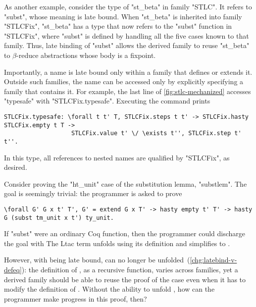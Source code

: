 As another example, consider the type of "st_beta" in family "STLC".
It refers to "subst", whose meaning is late bound.
When "st_beta" is inherited into family "STLCFix", "st_beta" has a type that now
refers to the "subst" function in "STLCFix", where "subst" is defined
by handling all the five cases known to that family.
Thus, late binding of "subst" allows the derived family to reuse "st_beta"
to $\beta$-reduce abstractions whose body is a fixpoint.

Importantly, a name is late bound only within a family that defines or extends it.
Outside such families, the name can be accessed only by explicitly
specifying a family that contains it.
For example, the last line of \cref{fig:stlc-mechanized} accesses "typesafe"
with "STLCFix.typesafe".
Executing the command prints

\begin{lstlisting}[basicstyle=\fontsize{8.25}{9}\ttfamily]
STLCFix.typesafe: \forall t t' T, STLCFix.steps t t' -> STLCFix.hasty STLCFix.empty t T ->
                   STLCFix.value t' \/ \exists t'', STLCFix.step t' t''.
\end{lstlisting}

\noindent
In this type, all references to nested names are qualified by "STLCFix", as desired.



Consider proving the "ht_unit" case of the substitution lemma, "substlem".
The goal is seemingly trivial: the programmer is asked to prove

\begin{lstlisting}[basicstyle=\fontsize{8.25}{9}\ttfamily]
\forall G' G x t' T', G' = extend G x T' -> hasty empty t' T' -> hasty G (subst tm_unit x t') ty_unit.
\end{lstlisting}

\noindent
If "subst" were an ordinary Coq function, then the programmer could
discharge the goal with
The Ltac term  unfolds  using its definition
and simplifies  to .

However, with  being late bound,  can no longer
be unfolded~(\ref{chg:latebind-v-defeq}):
the definition of , as a recursive function,
varies across families, yet a derived family should be able to reuse the
proof of the  case
even when it has to modify the definition of .
Without the ability to unfold ,
how can the programmer make progress in this proof, then?

